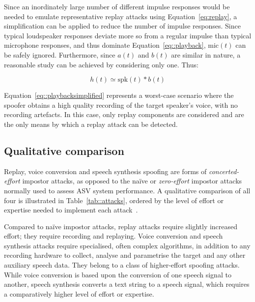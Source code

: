Since an inordinately large number of different impulse responses would be needed to emulate representative replay attacks using Equation~\ref{eq:replay}, a simplification can be applied to reduce the number of impulse responses.  Since typical loudspeaker responses deviate more so from a regular impulse than typical microphone responses, and thus dominate Equation~\ref{eq::playback}, $\mathrm{mic}(t)$ can be safely ignored.  Furthermore, since $a(t)$ and $b(t)$ are similar in nature, a reasonable study can be achieved by considering only one.  Thus:

\begin{equation}
h(t) \simeq \mathrm{spk}(t) * b(t)
\label{eq::playbacksimplified}
\end{equation}

Equation~\ref{eq::playbacksimplified} represents a worst-case scenario where the spoofer obtains a high quality recording of the target speaker's voice, with no recording artefacts.  In this case, only replay components are considered and are the only means by which a replay attack can be detected.



\subsection{Qualitative comparison}
\label{sec::algorithms::comparison}



Replay, voice conversion and speech synthesis spoofing are forms of \emph{concerted-effort} impostor attacks, as opposed to the na\"{i}ve or \emph{zero-effort} impostor attacks normally used to assess ASV system performance.  A qualitative comparison of all four is illustrated in Table~\ref{tab::attacks}, ordered by the level of effort or expertise needed to implement each attack~\cite{Wu2014a}. 

Compared to na\"{i}ve impostor attacks, replay attacks require slightly increased effort; they require recording and replaying. Voice conversion and speech synthesis attacks require specialised, often complex algorithms, in addition to any recording hardware to collect, analyse and parametrise the target and any other auxiliary speech data.  They belong to a class of higher-effort spoofing attacks.  While voice conversion is based upon the conversion of one speech signal to another, speech synthesis converts a text string to a speech signal, which requires a comparatively higher level of effort or expertise.

